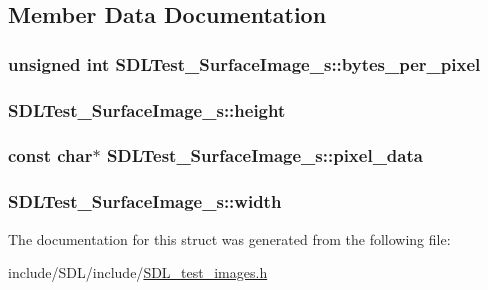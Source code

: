 \subsection{Member Data Documentation}
\hypertarget{struct_s_d_l_test___surface_image__s_a2daf91bab3d79fb9dfa25e8ade43e606}{
\subsubsection[{bytes\-\_\-per\-\_\-pixel}]{\setlength{\rightskip}{0pt plus 5cm}unsigned {\bf int} S\-D\-L\-Test\-\_\-\-Surface\-Image\-\_\-s\-::bytes\-\_\-per\-\_\-pixel}}\label{struct_s_d_l_test___surface_image__s_a2daf91bab3d79fb9dfa25e8ade43e606}
\hypertarget{struct_s_d_l_test___surface_image__s_a310092874695556e4b7f1f63aec24213}{
\subsubsection[{height}]{ S\-D\-L\-Test\-\_\-\-Surface\-Image\-\_\-s\-::height}}\label{struct_s_d_l_test___surface_image__s_a310092874695556e4b7f1f63aec24213}
\hypertarget{struct_s_d_l_test___surface_image__s_acf2d3006bea5690f564d3003d1512fa7}{
\subsubsection[{pixel\-\_\-data}]{\setlength{\rightskip}{0pt plus 5cm}const char$\ast$ S\-D\-L\-Test\-\_\-\-Surface\-Image\-\_\-s\-::pixel\-\_\-data}}\label{struct_s_d_l_test___surface_image__s_acf2d3006bea5690f564d3003d1512fa7}
\hypertarget{struct_s_d_l_test___surface_image__s_a3cbacf6b015a22832ab4d3f509719609}{
\subsubsection[{width}]{ S\-D\-L\-Test\-\_\-\-Surface\-Image\-\_\-s\-::width}}\label{struct_s_d_l_test___surface_image__s_a3cbacf6b015a22832ab4d3f509719609}


The documentation for this struct was generated from the following file\-:\begin{DoxyCompactItemize}
\item 
include/\-S\-D\-L/include/\hyperlink{_s_d_l__test__images_8h}{S\-D\-L\-\_\-test\-\_\-images.\-h}\end{DoxyCompactItemize}
